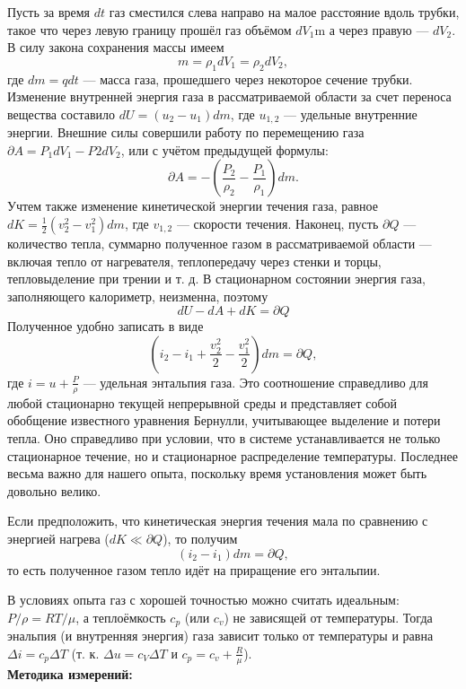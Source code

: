 \documentclass[a4paper, 12pt]{article}%
\begin{document}
	Пусть за время $dt$ газ сместился слева направо на малое расстояние вдоль
	трубки, такое что через левую границу прошёл газ объёмом $dV_1$m а через правую --- $dV_2$. В силу закона сохранения массы имеем
	\[
	m = \rho_1 dV_1 = \rho_2 d V_2,
	\]
	где $dm = q dt$ --- масса газа, прошедшего через некоторое сечение трубки.
	Изменение внутренней энергия газа в рассматриваемой области за счет переноса вещества составило $dU = (u_2 - u_1)dm$, где $u_{1, 2}$ --- удельные внутренние энергии. Внешние силы совершили работу по перемещению газа $\partial A = P_1 dV_1 - P2 dV_2$, или с учётом предыдущей формулы:
	\[
	\partial A = - (\frac{P_2}{\rho_2} - \frac{P_1}{\rho_1})dm.
	\]
	Учтем также изменение кинетической энергии течения газа, равное $dK = \frac{1}{2}(v_2^2 - v_1^2)dm$, где $v_{1, 2}$ --- скорости течения. Наконец, пусть $\partial Q$ --- количество тепла, суммарно полученное газом в рассматриваемой области --- включая тепло от нагревателя, теплопередачу через стенки и торцы, тепловыделение при трении и т. д. В стационарном состоянии энергия газа, заполняющего калориметр, неизменна, поэтому
	\[
	dU - dA + dK = \partial Q
	\]
	Полученное удобно записать в виде
	\[
	(i_2 - i_1 + \frac{v_2^2}{2} - \frac{v_1^2}{2}) dm = \partial Q,
	\]
	где $i = u + \frac{P}{\rho}$ --- удельная энтальпия газа.
	Это соотношение справедливо для любой стационарно текущей непрерывной среды и представляет собой обобщение известного уравнения Бернулли, учитывающее выделение и потери тепла. Оно справедливо при условии, что в системе устанавливается не только стационарное течение, но и стационарное распределение температуры. Последнее весьма важно для нашего опыта, поскольку время установления может быть довольно велико.
	
	Если предположить, что кинетическая энергия течения мала по сравнению с энергией нагрева ($dK \ll \partial Q$), то получим 
	\[
	(i_2 - i_1) dm = \partial Q,
	\]
	то есть полученное газом тепло идёт на приращение его энтальпии.
	
	В условиях опыта газ с хорошей точностью можно считать идеальным: $P / \rho = RT / \mu$, а теплоёмкость $c_p$ (или $c_v$) не зависящей от температуры. Тогда энальпия (и внутренняя энергия) газа зависит только от температуры и равна $\Delta i = c_p \Delta T$ (т. к. $\Delta u = c_V \Delta T$ и $c_p = c_v + \frac{R}{\mu}$).\\
	
	\newpage
\textbf{Методика измерений: }\\
\end{document}

